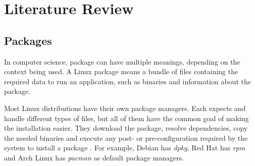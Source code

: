 \chapter{Literature Review}
\label {sec:literature_review}

\section{Packages}
\label {sec:packages}

In computer science, package can have multiple meanings, depending on the context being used. A Linux package means a bundle of files containing the required data to run an application, such as binaries and information about the package.

Most Linux distributions have their own package managers. Each expects and handle different types of files, but all of them have the common goal of making the installation easier. They download the package, resolve dependencies, copy the needed binaries and execute any post- or pre-configuration required by the system to install a package \cite{linode2017linux}. For example, Debian has \textit{dpkg}, Red Hat has \textit{rpm} and Arch Linux has \textit{pacman} as default package managers.
